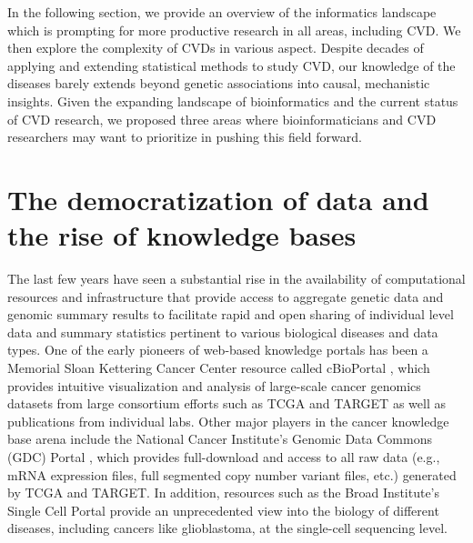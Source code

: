 \documentclass[letter]{bib}
\begin{document}
In the following section, we provide an overview of the informatics landscape which is prompting for more productive research in all areas, including CVD. We then  explore the complexity of CVDs in various aspect. Despite decades of applying and extending statistical methods to study CVD, our knowledge of the diseases barely extends beyond genetic associations into causal, mechanistic insights. Given the expanding landscape of bioinformatics and the current status of CVD research, we proposed three areas where bioinformaticians and CVD researchers may want to prioritize in pushing this field forward.

\section*{The democratization of data and the rise of knowledge bases}

The last few years have seen a substantial rise in the availability of computational resources and infrastructure that provide access to aggregate genetic data and genomic summary results to facilitate rapid and open sharing of individual level data and summary statistics pertinent to various biological diseases and data types.  One of the early pioneers of web-based knowledge portals has been a Memorial Sloan Kettering Cancer Center resource called cBioPortal \citep{Cerami:2012:cBio,Gao:2013:Integrative}, which provides intuitive visualization and analysis of large-scale cancer genomics datasets from large consortium efforts such as TCGA \citep{TCGA:2013:Cancer} and TARGET \citep{Koscielny:2017:Open} as well as publications from individual labs.  Other major players in the cancer knowledge base arena include the National Cancer Institute's Genomic Data Commons (GDC) Portal \citep{Grossman:2016:Shared,Jensen:2017:NCI}, which provides full-download and access to all raw data (e.g., mRNA expression files, full segmented copy number variant files, etc.) generated by TCGA and TARGET.  In addition, resources such as the Broad Institute's Single Cell Portal \citep{Broad:2018:Single} provide an unprecedented view into the biology of different diseases, including cancers like glioblastoma, at the single-cell sequencing level.    
	
\end{document}
